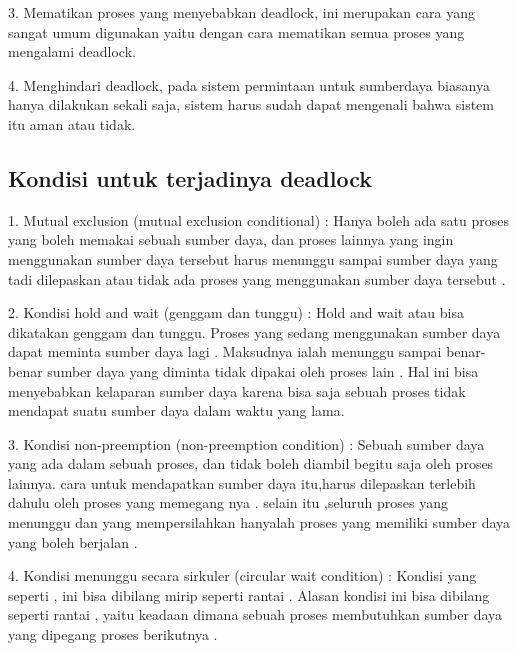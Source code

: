 	3. Mematikan proses yang menyebabkan deadlock, ini merupakan cara yang sangat umum digunakan yaitu dengan cara mematikan semua proses yang mengalami deadlock.
	
	4. Menghindari deadlock, pada sistem permintaan untuk sumberdaya biasanya hanya dilakukan sekali saja, sistem harus sudah dapat mengenali bahwa sistem itu aman atau tidak.
	
\subsection {Kondisi untuk terjadinya deadlock}
	1. Mutual exclusion (mutual exclusion conditional) : Hanya boleh ada satu proses yang boleh memakai sebuah sumber daya, dan proses lainnya yang ingin menggunakan sumber daya tersebut harus menunggu sampai sumber daya yang tadi dilepaskan atau tidak ada proses yang menggunakan sumber daya tersebut .
	
	2. Kondisi hold and wait (genggam dan tunggu) : Hold and wait atau bisa dikatakan genggam dan tunggu. Proses yang sedang menggunakan sumber daya dapat meminta sumber daya lagi . Maksudnya ialah menunggu sampai benar-benar sumber daya yang diminta tidak dipakai oleh proses lain . Hal ini bisa menyebabkan kelaparan sumber daya karena bisa saja sebuah proses tidak mendapat suatu sumber daya dalam waktu yang lama.
	
	3. Kondisi non-preemption (non-preemption condition) : Sebuah sumber daya yang ada dalam sebuah proses, dan tidak boleh diambil begitu saja oleh proses lainnya. cara untuk mendapatkan sumber daya itu,harus dilepaskan terlebih dahulu oleh proses yang memegang nya . selain itu ,seluruh proses yang menunggu dan yang mempersilahkan hanyalah proses yang memiliki sumber daya yang boleh berjalan .
	
	4. Kondisi menunggu secara sirkuler (circular wait condition) : Kondisi yang seperti , ini bisa dibilang mirip seperti rantai . Alasan kondisi ini bisa dibilang seperti rantai , yaitu keadaan dimana sebuah proses membutuhkan sumber daya yang dipegang proses berikutnya . 